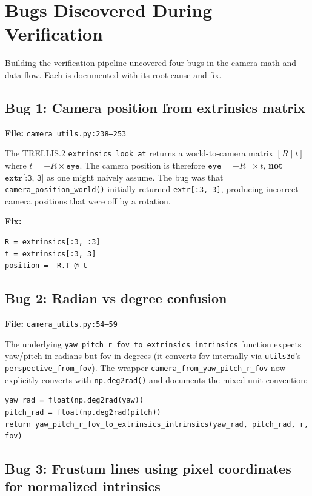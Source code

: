 \section{Bugs Discovered During Verification}

Building the verification pipeline uncovered four bugs in the camera math
and data flow. Each is documented with its root cause and fix.

\subsection{Bug 1: Camera position from extrinsics matrix}

\textbf{File:} \texttt{camera\_utils.py:238--253}

The TRELLIS.2 \texttt{extrinsics\_look\_at} returns a world-to-camera
matrix $[R \mid t]$ where $t = -R \times \texttt{eye}$. The camera position
is therefore $\texttt{eye} = -R^\top \times t$, \textbf{not}
$\texttt{extr[:3, 3]}$ as one might naively assume. The bug was that
\texttt{camera\_position\_world()} initially returned \texttt{extr[:3, 3]},
producing incorrect camera positions that were off by a rotation.

\textbf{Fix:}
\begin{lstlisting}
R = extrinsics[:3, :3]
t = extrinsics[:3, 3]
position = -R.T @ t
\end{lstlisting}

\subsection{Bug 2: Radian vs degree confusion}

\textbf{File:} \texttt{camera\_utils.py:54--59}

The underlying \texttt{yaw\_pitch\_r\_fov\_to\_extrinsics\_intrinsics}
function expects yaw/pitch in radians but fov in degrees (it converts fov
internally via \texttt{utils3d}'s \texttt{perspective\_from\_fov}). The
wrapper \texttt{camera\_from\_yaw\_pitch\_r\_fov} now explicitly converts
with \texttt{np.deg2rad()} and documents the mixed-unit convention:
\begin{lstlisting}
yaw_rad = float(np.deg2rad(yaw))
pitch_rad = float(np.deg2rad(pitch))
return yaw_pitch_r_fov_to_extrinsics_intrinsics(yaw_rad, pitch_rad, r, fov)
\end{lstlisting}

\subsection{Bug 3: Frustum lines using pixel coordinates for normalized intrinsics}

